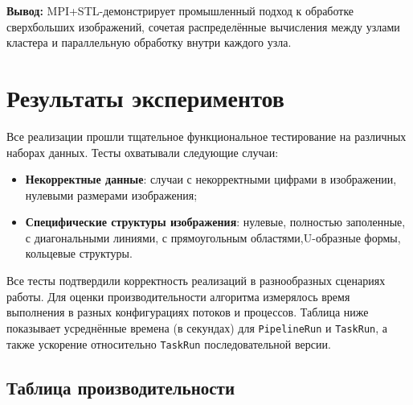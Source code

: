 \documentclass[12pt]{extarticle}
\begin{document}
\textbf{Вывод:} MPI+STL-демонстрирует промышленный подход к обработке сверхбольших изображений, сочетая распределённые вычисления между узлами кластера и параллельную обработку внутри каждого узла.
\newpage
\section{Результаты экспериментов}

\hspace*{1.25cm}Все реализации прошли тщательное функциональное тестирование на различных наборах данных. Тесты охватывали следующие случаи:
\begin{itemize}
  \item \textbf{Некорректные данные}: случаи с некорректными цифрами в изображении, нулевыми размерами изображения; \\[-0.9cm]
  \item \textbf{Специфические структуры изображения}: нулевые, полностью заполенные, с диагональными линиями, с прямоугольным областями,U-образные формы, кольцевые структуры.\\[-0.9cm]
 
\end{itemize}

Все тесты подтвердили корректность реализаций в разнообразных сценариях работы. Для оценки производительности алгоритма измерялось время выполнения в разных конфигурациях потоков и процессов. Таблица ниже показывает усреднённые времена (в секундах) для \texttt{PipelineRun} и \texttt{TaskRun}, а также ускорение относительно \texttt{TaskRun} последовательной версии.

\subsection{Таблица производительности}
\end{document}
